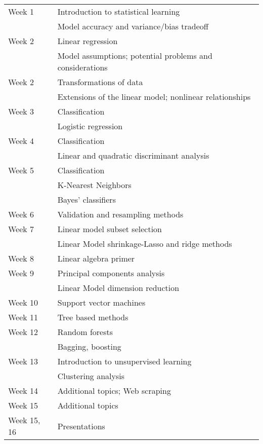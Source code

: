 \begin{tabular}{ l l }
 \hline  
Week 1 & Introduction to statistical learning  \\
  & Model accuracy and variance/bias tradeoff \\
\hline
Week 2 & Linear regression  \\
&  Model assumptions; potential problems and considerations \\
\hline
Week 2 &  Transformations of data \\
 & Extensions of the linear model; nonlinear relationships \\
  \hline
Week 3 & Classification  \\
& Logistic regression   \\
\hline
Week 4 & Classification \\
&  Linear and quadratic discriminant analysis   \\
\hline
Week 5 & Classification \\
&   K-Nearest Neighbors \\
& Bayes' classifiers \\
\hline
Week 6 
& Validation and resampling methods    \\
\hline
Week 7  
  & Linear model subset selection  \\
 & Linear Model shrinkage-Lasso and ridge methods \\
 \hline
Week 8
&  Linear algebra primer  \\
\hline
Week 9 & Principal components analysis \\
&  Linear Model dimension reduction  \\
\hline
Week 10  & 
 Support vector machines \\
 \hline
Week 11
& Tree based methods \\
\hline
Week 12
 & Random forests  \\
& Bagging, boosting  \\
\hline
Week 13
& Introduction to unsupervised learning  \\
& Clustering analysis    \\
\hline
Week 14 & Additional topics; Web scraping \\
\hline
Week 15 & Additional topics   \\
\hline
Week  15, 16 & Presentations \\
\end{tabular}




